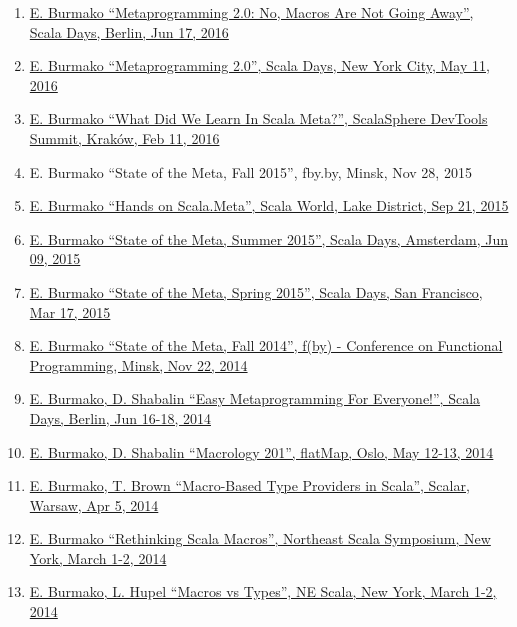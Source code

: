 \documentclass[margin, 10pt]{Stylesheet}
\begin{document}
\begin{resume}
\begin{enumerate}
\item \href{http://scalamacros.org/paperstalks/2016-06-17-Metaprogramming20.pdf}{E. Burmako ``Metaprogramming 2.0: No, Macros Are Not Going Away'', Scala Days, Berlin, Jun 17, 2016}
\item \href{http://scalamacros.org/paperstalks/2016-05-11-Metaprogramming20.pdf}{E. Burmako ``Metaprogramming 2.0'', Scala Days, New York City, May 11, 2016}
\item \href{http://scalamacros.org/paperstalks/2016-02-11-WhatDidWeLearnInScalaMeta.pdf}{E. Burmako ``What Did We Learn In Scala Meta?'', ScalaSphere DevTools Summit, Krak\'{o}w, Feb 11, 2016}
\item E. Burmako ``State of the Meta, Fall 2015'', fby.by, Minsk, Nov 28, 2015
\item \href{https://github.com/scalameta/tutorial}{E. Burmako ``Hands on Scala.Meta'', Scala World, Lake District, Sep 21, 2015}
\item \href{http://scalamacros.org/paperstalks/2015-06-09-StateOfTheMetaSummer2015.pdf}{E. Burmako ``State of the Meta, Summer 2015'', Scala Days, Amsterdam, Jun 09, 2015}
\item \href{http://scalamacros.org/paperstalks/2015-03-17-StateOfTheMetaSpring2015.pdf}{E. Burmako ``State of the Meta, Spring 2015'', Scala Days, San Francisco, Mar 17, 2015}
\item \href{http://scalamacros.org/paperstalks/2014-11-22-TheStateOfTheMeta.pdf}{E. Burmako ``State of the Meta, Fall 2014'', f(by) - Conference on Functional Programming, Minsk, Nov 22, 2014}
\item \href{http://scalamacros.org/paperstalks/2014-06-17-EasyMetaprogrammingForEveryone.pdf}{E. Burmako, D. Shabalin ``Easy Metaprogramming For Everyone!'', Scala Days, Berlin, Jun 16-18, 2014}
\item \href{https://github.com/scalamacros/macrology201}{E. Burmako, D. Shabalin ``Macrology 201'', flatMap, Oslo, May 12-13, 2014}
\item \href{https://github.com/travisbrown/type-provider-examples/blob/master/docs/scalar-2014-slides.pdf?raw=true}{E. Burmako, T. Brown ``Macro-Based Type Providers in Scala'', Scalar, Warsaw, Apr 5, 2014}
\item \href{http://scalamacros.org/paperstalks/2014-03-02-RethinkingScalaMacros.pdf}{E. Burmako ``Rethinking Scala Macros'', Northeast Scala Symposium, New York, March 1-2, 2014}
\item \href{http://scalamacros.org/paperstalks/2014-03-01-MacrosVsTypes.pdf}{E. Burmako, L. Hupel ``Macros vs Types'', NE Scala, New York, March 1-2, 2014}

\end{enumerate}
\end{resume}
\end{document}
